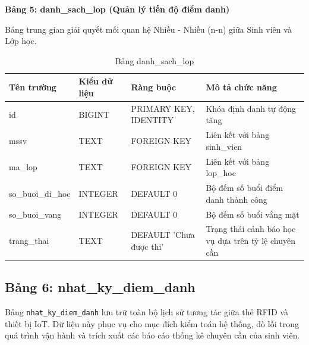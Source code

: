 \documentclass[12pt,a4paper]{report}
\begin{document}
\textbf{Bảng 5: danh\_sach\_lop (Quản lý tiến độ điểm danh)}

Bảng trung gian giải quyết mối quan hệ Nhiều - Nhiều (n-n) giữa Sinh viên và Lớp học.

\begin{table}[H]
\centering
\caption{Bảng danh\_sach\_lop}
\begin{tabularx}{\textwidth}{|l|l|l|X|}
\hline
\textbf{Tên trường} & \textbf{Kiểu dữ liệu} & \textbf{Ràng buộc} & \textbf{Mô tả chức năng} \\ \hline
id & BIGINT & PRIMARY KEY, IDENTITY & Khóa định danh tự động tăng \\ \hline
mssv & TEXT & FOREIGN KEY & Liên kết với bảng sinh\_vien \\ \hline
ma\_lop & TEXT & FOREIGN KEY & Liên kết với bảng lop\_hoc \\ \hline
so\_buoi\_di\_hoc & INTEGER & DEFAULT 0 & Bộ đếm số buổi điểm danh thành công \\ \hline
so\_buoi\_vang & INTEGER & DEFAULT 0 & Bộ đếm số buổi vắng mặt \\ \hline
trang\_thai & TEXT & DEFAULT 'Chưa được thi' & Trạng thái cảnh báo học vụ dựa trên tỷ lệ chuyên cần \\ \hline
\end{tabularx}
\end{table}

\subsection{Bảng 6: nhat\_ky\_diem\_danh}

Bảng \texttt{nhat\_ky\_diem\_danh} lưu trữ toàn bộ lịch sử tương tác giữa thẻ RFID và thiết bị IoT. 
Dữ liệu này phục vụ cho mục đích kiểm toán hệ thống, dò lỗi trong quá trình vận hành và trích xuất 
các báo cáo thống kê chuyên cần của sinh viên.
\end{document}
